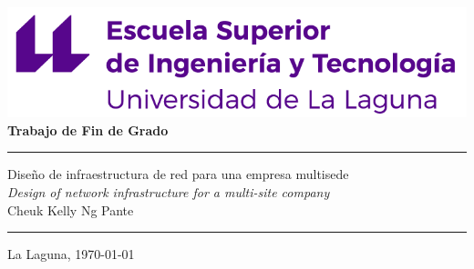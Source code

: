 \documentclass[spanish,a4paper,11pt,oneside]{extreport}
\begin{document}
\renewcommand\listtablename{Índice de Tablas}
\renewcommand\listfigurename{Índice de Figuras}

\pagestyle{empty}
\thispagestyle{empty}


\newcommand{\HRule}{\rule{\linewidth}{1mm}}
\setlength{\parindent}{0mm}
\setlength{\parskip}{0mm}


\begin{center}
	\includegraphics[scale=0.8]{images/escuela-ingenieria-tecnologia-original}\\[10mm]
	{\Huge\bf  Trabajo de Fin de Grado}
\end{center}

\HRule
\begin{center}
	{\Huge Diseño de infraestructura de red para una empresa multisede} \\[3.5mm]
	{\Large \textit{Design of network infrastructure for a multi-site company}} \\[5mm]
	{\Large Cheuk Kelly Ng Pante} \\[5mm]


\end{center}
\HRule
{}
\begin{center}
	\Large La Laguna, \today
\end{center}

\setlength{\parindent}{5mm}


\newpage
\thispagestyle{empty}
\vspace*{\fill}
\begin{center}
\end{center}
\vspace*{\fill}
\newpage
\end{document}
